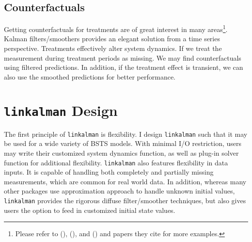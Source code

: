 \documentclass[10pt, titlepage]{article}
\numberwithin{equation}{section}
\begin{document}
\subsection{Counterfactuals}
Getting counterfactuals for treatments are of great interest in many areas\footnote{Please refer to (\cite{brodersen_etal_2015}), (\cite{harvey_1985}), and (\cite{harvey2007trends}) and papers they cite for more examples.}. Kalman filters/smoothers provides an elegant solution from a time series perspective. Treatments effectively alter system dynamics. If we treat the measurement during treatment periods as missing. We may find counterfactuals using filtered predictions. In addition, if the treatment effect is transient, we can also use the smoothed predictions for better performance. 

\section{\texttt{linkalman} Design} \label{sec:codebase}
The first principle of \texttt{linkalman} is flexibility. I design \texttt{linkalman} such that it may be used for a wide variety of BSTS models. With minimal I/O restriction, users may write their customized system dynamics function, as well as plug-in solver function for additional flexibility. \texttt{linkalman} also features flexibility in data inputs. It is capable of handling both completely and partially missing measurements, which are common for real world data. In addition, whereas many other packages use approximation approach to handle unknown initial values, \texttt{linkalman} provides the rigorous diffuse filter/smoother techniques, but also gives users the option to feed in customized initial state values. 
\end{document}
